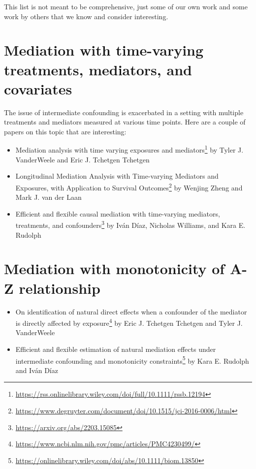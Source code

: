 \documentclass[
  12pt,
]{book}
\providecommand{\tightlist}{%
  \setlength{\itemsep}{0pt}\setlength{\parskip}{0pt}}
\renewcommand{\href}[2]{#2\footnote{\url{#1}}}
\theoremstyle{definition}
\theoremstyle{definition}
\theoremstyle{definition}
\newcommand{\1}{\mathbbm{1}}
\begin{document}
This list is not meant to be comprehensive, just some of our own work and some
work by others that we know and consider interesting.

\hypertarget{mediation-with-time-varying-treatments-mediators-and-covariates}{%
\section{Mediation with time-varying treatments, mediators, and covariates}\label{mediation-with-time-varying-treatments-mediators-and-covariates}}

The issue of intermediate confounding is exacerbated in a setting with multiple
treatments and mediators measured at various time points. Here are a couple of
papers on this topic that are interesting:

\begin{itemize}
\tightlist
\item
  \href{https://rss.onlinelibrary.wiley.com/doi/full/10.1111/rssb.12194}{Mediation analysis with time varying exposures and
  mediators}
  by Tyler J. VanderWeele and Eric J. Tchetgen Tchetgen
\item
  \href{https://www.degruyter.com/document/doi/10.1515/jci-2016-0006/html}{Longitudinal Mediation Analysis with Time-varying Mediators and
  Exposures, with Application to Survival
  Outcomes}
  by Wenjing Zheng and Mark J. van der Laan
\item
  \href{https://arxiv.org/abs/2203.15085}{Efficient and flexible causal mediation with time-varying
  mediators, treatments, and
  confounders} by Iván Díaz,
  Nicholas Williams, and Kara E. Rudolph
\end{itemize}

\hypertarget{mediation-with-monotonicity-of-a-z-relationship}{%
\section{Mediation with monotonicity of A-Z relationship}\label{mediation-with-monotonicity-of-a-z-relationship}}

\begin{itemize}
\tightlist
\item
  \href{https://www.ncbi.nlm.nih.gov/pmc/articles/PMC4230499/}{On identification of natural direct effects when a confounder of the mediator
  is directly affected by
  exposure} by Eric J.
  Tchetgen Tchetgen and Tyler J. VanderWeele
\item
  \href{https://onlinelibrary.wiley.com/doi/abs/10.1111/biom.13850}{Efficient and flexible estimation of natural mediation effects under
  intermediate confounding and monotonicity
  constraints} by Kara E. Rudolph and Iván
  Díaz
\end{itemize}
\end{document}
